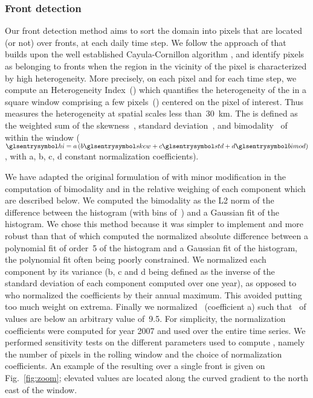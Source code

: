 \subsubsection{Front detection}

Our front detection method aims to sort the domain into pixels that are located (or not) over fronts, at each daily time step.
We follow the approach of \textcite{liu_2016} that builds upon the well established Cayula-Cornillon algorithm \parencite{cayula_1992, belkin_2009}, and identify pixels as belonging to fronts when the region in the vicinity of the pixel is characterized by high  heterogeneity.
More precisely, on each pixel and for each time step, we compute an Heterogeneity Index~() which quantifies the heterogeneity of the  in a square window comprising a few pixels~() centered on the pixel of interest.
Thus  measures the  heterogeneity at spatial scales less than~\qty{30}{\km}.
The  is defined as the weighted sum of the skewness~, standard deviation~, and bimodality~ of  within the window (\(\am{hi} = a \left( b \am{skew} + c \am{std} + d \am{bimod} \right)\), with a, b, c, d constant normalization coefficients).

We have adapted the original formulation of \textcite{liu_2016} with minor modification in the computation of bimodality and in the relative weighing of each component which are described below.
We computed the bimodality as the L2 norm of the difference between the  histogram (with bins of~) and a Gaussian fit of the histogram.
We chose this method because it was simpler to implement and more robust than that of \textcite{liu_2016} which computed the normalized absolute difference between a polynomial fit of order~5 of the  histogram and a Gaussian fit of the histogram, the polynomial fit often being poorly constrained.
We normalized each component by its variance (b, c and d being defined as the inverse of the standard deviation of each component computed over one year), as opposed to \textcite{liu_2016} who normalized the coefficients by their annual maximum.
This avoided putting too much weight on extrema.
Finally we normalized ~(coefficient a) such that~ of values are below an arbitrary value of~\num{9.5}.
For simplicity, the normalization coefficients were computed for year 2007 and used over the entire time series.
We performed sensitivity tests on the different parameters used to compute , namely the number of pixels in the rolling window and the choice of normalization coefficients.
An example of the resulting  over a single front is given on Fig.~\ref{fig:zoom}; elevated  values are located along the curved  gradient to the north east of the window.

